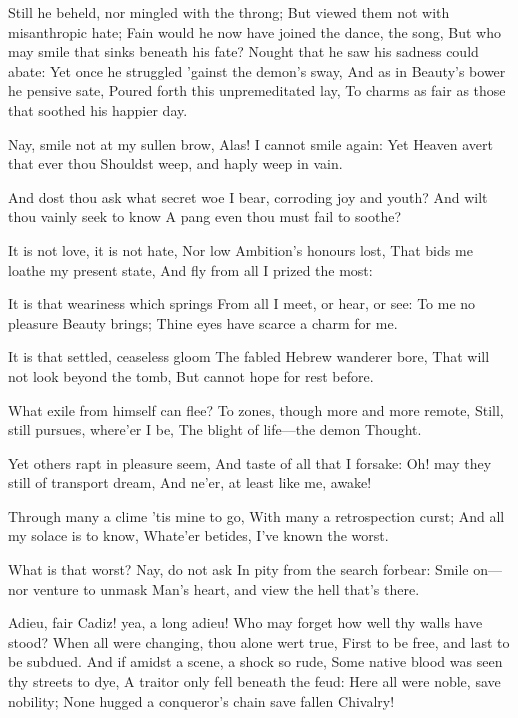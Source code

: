\documentclass[10pt,twocolumn]{book}
\begin{document}
   Still he beheld, nor mingled with the throng;
   But viewed them not with misanthropic hate;
   Fain would he now have joined the dance, the song,
   But who may smile that sinks beneath his fate?
   Nought that he saw his sadness could abate:
   Yet once he struggled 'gainst the demon's sway,
   And as in Beauty's bower he pensive sate,
   Poured forth this unpremeditated lay,
To charms as fair as those that soothed his happier day.

\spatium {1\leading}

{
  \Facies {}
  \Forma  {\rightskip 4.5em}

  \Forma {}
  \Facies          {\strophe}

Nay, smile not at my sullen brow,
   Alas! I cannot smile again:
Yet Heaven avert that ever thou
   Shouldst weep, and haply weep in vain.

And dost thou ask what secret woe
   I bear, corroding joy and youth?
And wilt thou vainly seek to know
   A pang even thou must fail to soothe?

It is not love, it is not hate,
   Nor low Ambition's honours lost,
That bids me loathe my present state,
   And fly from all I prized the most:

It is that weariness which springs
   From all I meet, or hear, or see:
To me no pleasure Beauty brings;
   Thine eyes have scarce a charm for me.

It is that settled, ceaseless gloom
   The fabled Hebrew wanderer bore,
That will not look beyond the tomb,
   But cannot hope for rest before.

What exile from himself can flee?
   To zones, though more and more remote,
Still, still pursues, where'er I be,
   The blight of life---the demon Thought.

Yet others rapt in pleasure seem,
   And taste of all that I forsake:
Oh! may they still of transport dream,
   And ne'er, at least like me, awake!

Through many a clime 'tis mine to go,
   With many a retrospection curst;
And all my solace is to know,
   Whate'er betides, I've known the worst.

What is that worst?  Nay, do not ask\textemdash
   In pity from the search forbear:
Smile on---nor venture to unmask
   Man's heart, and view the hell that's there.

}

   Adieu, fair Cadiz! yea, a long adieu!
   Who may forget how well thy walls have stood?
   When all were changing, thou alone wert true,
   First to be free, and last to be subdued.
   And if amidst a scene, a shock so rude,
   Some native blood was seen thy streets to dye,
   A traitor only fell beneath the feud:
   Here all were noble, save nobility;
None hugged a conqueror's chain save fallen Chivalry!
\end{document}
